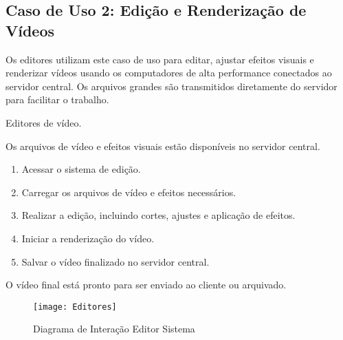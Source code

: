 \subsection{Caso de Uso 2: Edição e Renderização de Vídeos}
\begin{description}[style=nextline]
    \item[Descrição:] Os editores utilizam este caso de uso para editar, ajustar efeitos visuais e renderizar vídeos usando os computadores de alta performance conectados ao servidor central. Os arquivos grandes são transmitidos diretamente do servidor para facilitar o trabalho.
    
    \item[Atores:] Editores de vídeo.
    
    \item[Pré-condição:] Os arquivos de vídeo e efeitos visuais estão disponíveis no servidor central.
    
    \item[Sequência de Ações:]
    \begin{enumerate}
        \item Acessar o sistema de edição.
        \item Carregar os arquivos de vídeo e efeitos necessários.
        \item Realizar a edição, incluindo cortes, ajustes e aplicação de efeitos.
        \item Iniciar a renderização do vídeo.
        \item Salvar o vídeo finalizado no servidor central.
    \end{enumerate}
    
    \item[Pós-condição:] O vídeo final está pronto para ser enviado ao cliente ou arquivado.
\end{description}

\begin{figure}[ht]
    \centering
    \texttt{[image: Editores]}
    \caption{Diagrama de Interação Editor Sistema}
    \label{fig:diagram1}
\end{figure}


